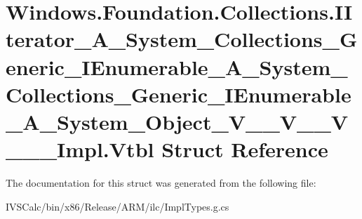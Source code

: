 \hypertarget{struct_windows_1_1_foundation_1_1_collections_1_1_i_iterator___a___system___collections___generiaa5ae0802b76fea6f276662a80e388f4}{}\section{Windows.\+Foundation.\+Collections.\+I\+Iterator\+\_\+\+A\+\_\+\+System\+\_\+\+Collections\+\_\+\+Generic\+\_\+\+I\+Enumerable\+\_\+\+A\+\_\+\+System\+\_\+\+Collections\+\_\+\+Generic\+\_\+\+I\+Enumerable\+\_\+\+A\+\_\+\+System\+\_\+\+Object\+\_\+\+V\+\_\+\+\_\+\+V\+\_\+\+\_\+\+V\+\_\+\+\_\+\+\_\+\+Impl.\+Vtbl Struct Reference}
\label{struct_windows_1_1_foundation_1_1_collections_1_1_i_iterator___a___system___collections___generiaa5ae0802b76fea6f276662a80e388f4}


The documentation for this struct was generated from the following file\+:\begin{DoxyCompactItemize}
\item 
I\+V\+S\+Calc/bin/x86/\+Release/\+A\+R\+M/ilc/Impl\+Types.\+g.\+cs\end{DoxyCompactItemize}
